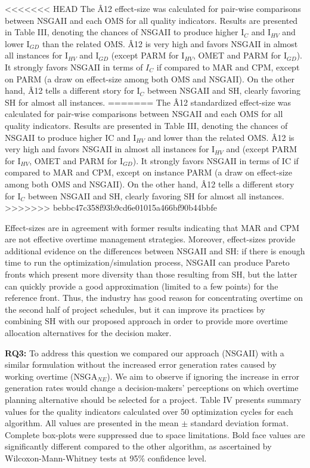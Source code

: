 \documentclass[conference]{IEEEtran}
\begin{document}
<<<<<<< HEAD
The {\^A12} effect-size was calculated for pair-wise comparisons between NSGAII and each OMS for all quality indicators. Results are presented in Table III, denoting the chances of NSGAII to produce higher I$_C$ and I$_{HV}$ and lower I$_{GD}$ than the related OMS. {\^A}12 is very high and favors NSGAII in almost all instances for I$_{HV}$ and I$_{GD}$ (except PARM for I$_{HV}$, OMET and PARM for I$_{GD}$). It strongly favors NSGAII in terms of $I_C$ if compared to MAR and CPM, except on PARM (a draw on effect-size among both OMS and NSGAII). On the other hand, {\^A}12 tells a different story for I$_{C}$ between NSGAII and SH, clearly favoring SH for almost all instances. 
=======
The \^A12 standardized effect-size was calculated for pair-wise comparisons between NSGAII and each OMS for all quality indicators. Results are presented in Table III, denoting the chances of NSGAII to produce higher IC and I$_{HV}$ and lower  than the related OMS. \^A12 is very high and favors NSGAII in almost all instances for I$_{HV}$ and  (except PARM for I$_{HV}$, OMET and PARM for I$_{GD}$). It strongly favors NSGAII in terms of IC if compared to MAR and CPM, except on instance PARM (a draw on effect-size among both OMS and NSGAII). On the other hand, \^A12 tells a different story for I$_{C}$ between NSGAII and SH, clearly favoring SH for almost all instances. 
>>>>>>> bebbc47c358f93b9cd6e01015a466bf90b44bbfe

Effect-sizes are in agreement with former results indicating that MAR and CPM are not effective overtime management strategies. Moreover, effect-sizes provide additional evidence on the differences between NSGAII and SH: if there is enough time to run the optimization/simulation process, NSGAII can produce Pareto fronts which present more diversity than those resulting from SH, but the latter can quickly provide a good approximation (limited to a few points) for the reference front. Thus, the industry has good reason for concentrating overtime on the second half of project schedules, but it can improve its practices by combining SH with our proposed approach in order to provide more overtime allocation alternatives for the decision maker.

\noindent
\textbf{RQ3:} To address this question we compared our approach (NSGAII) with a similar formulation without the increased error generation rates caused by working overtime (NSGA$_{NE}$). We aim to observe if ignoring the increase in error generation rates would change a decision-makers' perceptions on which overtime planning alternative should be selected for a project. Table IV presents summary values for the quality indicators calculated over 50 optimization cycles for each algorithm. All values are presented in the mean $\pm$ standard deviation format. Complete box-plots were suppressed due to space limitations. Bold face values are significantly different compared to the other algorithm, as ascertained by Wilcoxon-Mann-Whitney tests at 95\% confidence level. 
\end{document}
